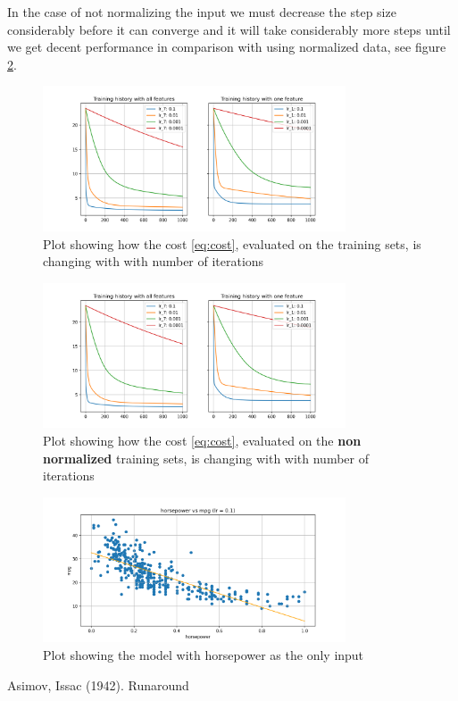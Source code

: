 \documentclass[a4paper,10pt]{article}
\begin{document}
In the case of not normalizing the input we must decrease the step size considerably before it can converge and it will take considerably more steps until we get decent performance in comparison with using normalized data, see figure \ref{fig:nonorm}. 

\begin{figure}[H]
 \centering
    \includegraphics[width=0.8\textwidth]{figures/all_one_feature.png}
    \caption{Plot showing how the cost \eqref{eq:cost}, evaluated on the training sets, is changing with with number of iterations}
    \label{fig:cost_per_iteration}
\end{figure}

\begin{figure}[H]
 \centering
    \includegraphics[width=0.8\textwidth]{figures/no_norm.png}
    \caption{Plot showing how the cost \eqref{eq:cost}, evaluated on the \textbf{non normalized} training sets, is changing with with number of iterations}
    \label{fig:nonorm}
\end{figure}

\begin{figure}[H]
 \centering
    \includegraphics[width=0.8\textwidth]{figures/hp_mpg.png}
    \caption{Plot showing the model with horsepower as the only input}
    \label{fig:hpvsmpg}
\end{figure}


\begin{thebibliography}{1}

 Asimov, Issac (1942). Runaround

\end{thebibliography}
\end{document}
